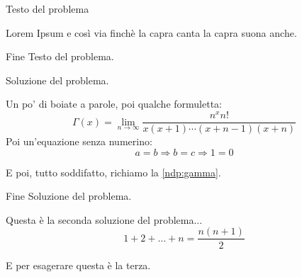 \documentclass[../main.tex]{subfiles}
\begin{document}

\textex
Testo del problema

Lorem Ipsum e così via finchè la capra canta la capra suona anche.

Fine Testo del problema.

\solution
Soluzione del problema.

Un po' di boiate a parole, poi qualche formuletta:
\begin{equation}\label{ndp:gamma}
	\Gamma(x)=\lim_{n\to\infty} \dfrac{n^xn!}{x(x+1)\cdots (x+n-1)(x+n)}
\end{equation}
Poi un'equazione senza numerino:
\begin{equation*}
	a=b \Rightarrow b=c \Rightarrow 1=0
\end{equation*}

E poi, tutto soddifatto, richiamo la \cref{ndp:gamma}.

Fine Soluzione del problema.

\solution[2]
Questa è la seconda soluzione del problema...
\begin{equation}
	1+2+\dots+n=\frac{n(n+1)}2
\end{equation}

\solution[3]
E per esagerare questa è la terza.
\end{document}
